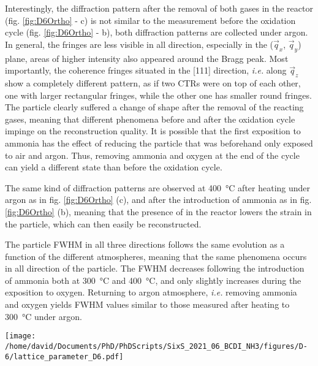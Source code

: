 Interestingly, the diffraction pattern after the removal of both gases in the reactor (fig. \ref{fig:D6Ortho} - c) is not similar to the measurement before the oxidation cycle (fig. \ref{fig:D6Ortho} - b), both diffraction patterns are collected under argon.
In general, the fringes are less visible in all direction, especially in the ($\vec{q}_x$, $\vec{q}_y$) plane, areas of higher intensity also appeared around the Bragg peak.
Most importantly, the coherence fringes situated in the [111] direction, \textit{i.e.} along $\vec{q}_z$ show a completely different pattern, as if two CTRs were on top of each other, one with larger rectangular fringes, while the other one has smaller round fringes.
The particle clearly suffered a change of shape after the removal of the reacting gases, meaning that different phenomena before and after the oxidation cycle impinge on the reconstruction quality.
It is possible that the first exposition to ammonia has the effect of reducing the particle that was beforehand only exposed to air and argon.
Thus, removing ammonia and oxygen at the end of the cycle can yield a different state than before the oxidation cycle.

The same kind of diffraction patterns are observed at \qty{400}{\degreeCelsius} after heating under argon as in fig. \ref{fig:D6Ortho} (c), and after the introduction of ammonia as in fig. \ref{fig:D6Ortho} (b), meaning that the presence of  in the reactor lowers the strain in the particle, which can then easily be reconstructed.

The particle FWHM in all three directions follows the same evolution as a function of the different atmospheres, meaning that the same phenomena occurs in all direction of the particle.
The FWHM decreases following the introduction of ammonia both at \qty{300}{\degreeCelsius} and \qty{400}{\degreeCelsius}, and only slightly increases during the exposition to oxygen.
Returning to argon atmosphere, \textit{i.e.} removing ammonia and oxygen yields FWHM values similar to those measured after heating to \qty{300}{\degreeCelsius} under argon.

\begin{SCfigure}
    \centering
    \texttt{[image: /home/david/Documents/PhD/PhDScripts/SixS\_2021\_06\_BCDI\_NH3/figures/D-6/lattice\_parameter\_D6.pdf]}
    \caption{
        Evolution of the interplanar spacing $d_{111}$ and homogeneous strain $\epsilon_{111}$ for particle C as a function of the ammonia to oxygen ratio.
        The reference for the computation of $\epsilon_{111}$ was taken at \qty{25}{\degreeCelsius}.
        The reproduction of measurements at fixed conditions yields multiple data points, lines at \qty{300}{\degreeCelsius} and \qty{400}{\degreeCelsius} link the data points in the order of the measurements.
        No scans were performed at \qty{400}{\degreeCelsius} under Argon after the oxidation cycle.
    }
    \label{fig:D6Latpara}
\end{SCfigure}

